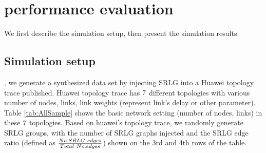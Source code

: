 \section{performance evaluation}
\label{sec:performance evaluation}
We first describe the simulation setup, then present the simulation results.
\subsection{Simulation setup}
, we generate a synthesized data  set by injecting SRLG into a Huawei topology trace published. Huawei topology trace has $7$ different topologies with various number of nodes, links, link weights (represent link's delay or other parameter).  Table \ref{tab:AllSample} shows the basic network setting (number of nodes, links) in these $7$ topologies. Based on huawei's topology trace, we randomly generate SRLG groups, with the number of SRLG graphs injected and the SRLG edge ratio (defined as $\frac{{No.SRLG \  {\rm{ }}edges}}{{Total \  {\rm{ }}No.edges}}$) shown on the 3rd and 4th rows of the table.





